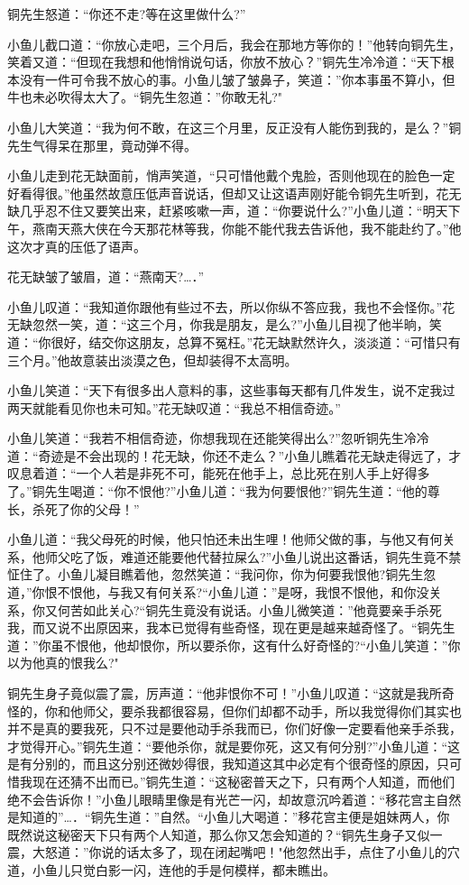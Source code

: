 \documentclass[12pt,oneside]{book}
\begin{document}
铜先生怒道：``你还不走?等在这里做什么?''

小鱼儿截口道：``你放心走吧，三个月后，我会在那地方等你的！''他转向铜先生，笑着又道：``但现在我想和他悄悄说句话，你放不放心？''铜先生冷冷道：``天下根本没有一件可令我不放心的事。小鱼儿皱了皱鼻子，笑道：''你本事虽不算小，但牛也未必吹得太大了。``铜先生忽道：''你敢无礼?"

小鱼儿大笑道：``我为何不敢，在这三个月里，反正没有人能伤到我的，是么？''铜先生气得呆在那里，竟动弹不得。

小鱼儿走到花无缺面前，悄声笑道，``只可惜他戴个鬼脸，否则他现在的脸色一定好看得很。''他虽然故意压低声音说话，但却又让这语声刚好能令铜先生听到，花无缺几乎忍不住又要笑出来，赶紧咳嗽一声，道：``你要说什么?''小鱼儿道：``明天下午，燕南天燕大侠在今天那花林等我，你能不能代我去告诉他，我不能赴约了。''他这次才真的压低了语声。

花无缺皱了皱眉，道：``燕南天?\ldots．''

小鱼儿叹道：``我知道你跟他有些过不去，所以你纵不答应我，我也不会怪你。''花无缺忽然一笑，道：``这三个月，你我是朋友，是么?''小鱼儿目视了他半晌，笑道：``你很好，结交你这朋友，总算不冤枉。''花无缺默然许久，淡淡道：``可惜只有三个月。''他故意装出淡漠之色，但却装得不太高明。

小鱼儿笑道：``天下有很多出人意料的事，这些事每天都有几件发生，说不定我过两天就能看见你也未可知。''花无缺叹道：``我总不相信奇迹。''

小鱼儿笑道：``我若不相信奇迹，你想我现在还能笑得出么?''忽听铜先生冷冷道：``奇迹是不会出现的！花无缺，你还不走么？''小鱼儿瞧着花无缺走得远了，才叹息着道：``一个人若是非死不可，能死在他手上，总比死在别人手上好得多了。''铜先生喝道：``你不恨他?''小鱼儿道：``我为何要恨他?''铜先生道：``他的尊长，杀死了你的父母！''

小鱼儿道：``我父母死的时候，他只怕还未出生哩！他师父做的事，与他又有何关系，他师父吃了饭，难道还能要他代替拉屎么?''小鱼儿说出这番话，铜先生竟不禁怔住了。小鱼儿凝目瞧着他，忽然笑道：``我问你，你为何要我恨他?铜先生忽道，''你恨不恨他，与我又有何关系?``小鱼儿道：''是呀，我恨不恨他，和你没关系，你又何苦如此关心?``铜先生竟没有说话。小鱼儿微笑道：''他竟要亲手杀死我，而又说不出原因来，我本已觉得有些奇怪，现在更是越来越奇怪了。``铜先生道：''你虽不恨他，他却恨你，所以要杀你，这有什么好奇怪的?``小鱼儿笑道：''你以为他真的恨我么?"

铜先生身子竟似震了震，厉声道：``他非恨你不可！''小鱼儿叹道：``这就是我所奇怪的，你和他师父，要杀我都很容易，但你们却都不动手，所以我觉得你们其实也并不是真的要我死，只不过是要他动手杀我而已，你们好像一定要看他亲手杀我，才觉得开心。''铜先生道：``要他杀你，就是要你死，这又有何分别?''小鱼儿道：``这是有分别的，而且这分别还微妙得很，我知道这其中必定有个很奇怪的原因，只可惜我现在还猜不出而已。''铜先生道：``这秘密普天之下，只有两个人知道，而他们绝不会告诉你！''小鱼儿眼睛里像是有光芒一闪，却故意沉吟着道：``移花宫主自然是知道的''\ldots．``铜先生道：''自然。``小鱼儿大喝道：''移花宫主便是姐妹两人，你既然说这秘密天下只有两个人知道，那么你又怎会知道的？``铜先生身子又似一震，大怒道：''你说的话太多了，现在闭起嘴吧！"他忽然出手，点住了小鱼儿的穴道，小鱼儿只觉白影一闪，连他的手是何模样，都未瞧出。
\end{document}
